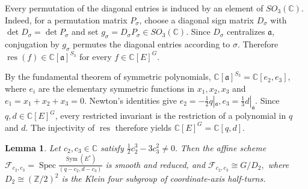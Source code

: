 \documentclass[10pt,a4paper]{amsart}
\numberwithin{equation}{section} \newtheorem{thm}{Theorem}[section] \newtheorem{lem}[thm]{Lemma} \newtheorem{ex}[thm]{Example} \newtheorem{prop}[thm]{Proposition} \newtheorem{cor}[thm]{Corollary} \newtheorem{defi}[thm]{Definition} \newtheorem{rmk}[thm]{Remark} \newtheorem{notation}[thm]{Notation}
\newcommand{\Sym}{\operatorname{Sym}}
\newcommand{\Spec}{\operatorname{Spec}}
\def\Z{\mathbb{Z}} \def\N{\mathbb{N}} \def\A{\mathbb{A}} \def\C{\mathbb{C}} \def\R{\mathbb{R}} \def\Q{\mathbb{Q}} \def\F{\mathbb{F}}
\begin{document}
Every permutation of the diagonal entries is induced by an element of $SO_3(\C)$. Indeed, for a permutation matrix $P_\sigma$, choose a diagonal sign matrix $D_\sigma$ with $\det D_\sigma=\det P_\sigma$ and set $g_\sigma=D_\sigma P_\sigma\in SO_3(\C)$. Since $D_\sigma$ centralizes $\mathfrak a$, conjugation by $g_\sigma$ permutes the diagonal entries according to $\sigma$. Therefore \(\operatorname{res}(f)\in\C[\mathfrak a]^{S_3}\) for every $f\in\C[E]^G$.

By the fundamental theorem of symmetric polynomials, \(\C[\mathfrak a]^{S_3}=\C[e_2,e_3]\), where $e_i$ are the elementary symmetric functions in $x_1,x_2,x_3$ and $e_1=x_1+x_2+x_3=0$. Newton's identities give \(e_2=-\frac12q|_{\mathfrak a}, e_3=\frac13d|_{\mathfrak a}\). Since $q,d\in\C[E]^G$, every restricted invariant is the restriction of a polynomial in $q$ and $d$. The injectivity of $\operatorname{res}$ therefore yields \(\C[E]^G=\C[q,d].\)

\begin{lem}\label{lem:regular-fiber}
Let $c_2,c_3\in\C$ satisfy \(\frac12c_2^3-3c_3^2\ne0.\) Then the affine scheme \(\mathcal F_{c_2,c_3} =\Spec\frac{\Sym(E^*)}{(q-c_2,d-c_3)}\) is smooth and reduced, and \(\mathcal F_{c_2,c_3}\cong G/D_2,\) where $D_2\cong(\Z/2)^2$ is the Klein four subgroup of coordinate-axis half-turns.
\end{lem}
\end{document}
